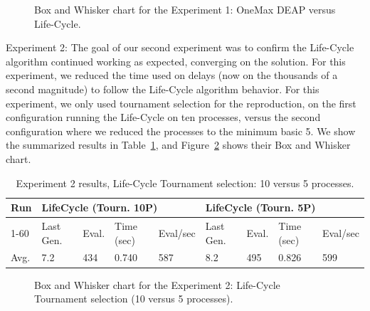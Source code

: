 \documentclass[runningheads]{llncs}
\begin{document}
\begin{figure}
    \caption{Box and Whisker chart for the Experiment 1: OneMax DEAP versus Life-Cycle.} \label{fig6}
    \end{figure}


Experiment 2: The goal of our second experiment was to confirm the Life-Cycle
algorithm continued working as expected, converging on the solution. For this
experiment, we reduced the time used on delays (now on the thousands of a
second magnitude) to follow the Life-Cycle algorithm behavior. For this
experiment, we only used tournament selection for the reproduction, on the
first configuration running the Life-Cycle on ten processes, versus the second
configuration where we reduced the processes to the minimum basic 5. We show
the summarized results in Table~\ref{tab3}, and Figure~\ref{fig7} shows their Box and Whisker
chart.

\begin{table}[]
    \centering        
    \caption{Experiment 2 results, Life-Cycle Tournament selection: 10 versus 5 processes.}\label{tab3}
    \begin{tabular}{|l|l|l|l|l|l|l|l|l|}
    \hline
    Run & \multicolumn{4}{l|}{LifeCycle (Tourn. 10P)} & \multicolumn{4}{l|}{LifeCycle (Tourn. 5P)} \\ \hline
    1-60 & Last Gen. & Eval. & Time (sec) & Eval/sec & Last Gen. & Eval. & Time (sec) & Eval/sec \\ \hline
    Avg. & 7.2 & 434 & 0.740 & 587 & 8.2 & 495 & 0.826 & 599 \\ \hline
    \end{tabular}
    \end{table}

\begin{figure}
    \caption{Box and Whisker chart for the Experiment 2: Life-Cycle Tournament selection (10 versus 5 processes).} \label{fig7}
    \end{figure}
\end{document}
